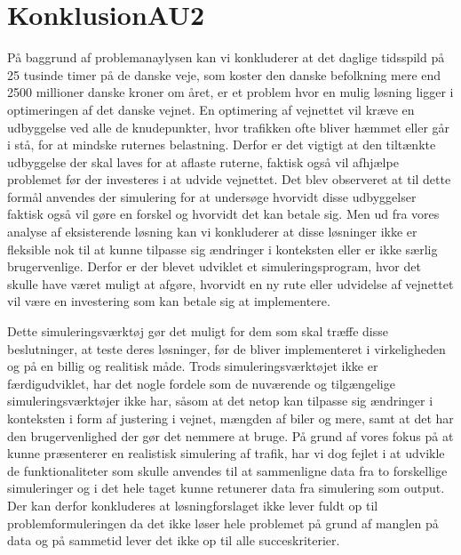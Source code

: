 \chapter{KonklusionAU2}\label{Konklusion}
På baggrund af problemanaylysen kan vi konkluderer at det daglige tidsspild på 25 tusinde timer på de danske veje, som koster den danske befolkning mere end 2500 millioner danske kroner om året, er et problem hvor en mulig løsning ligger i optimeringen af det danske vejnet. En optimering af vejnettet vil kræve en udbyggelse ved alle de knudepunkter, hvor trafikken ofte bliver hæmmet eller går i stå, for at mindske ruternes belastning. Derfor er det vigtigt at den tiltænkte udbyggelse der skal laves for at aflaste ruterne, faktisk også vil afhjælpe problemet før der investeres i at udvide vejnettet. Det blev observeret at til dette formål anvendes der simulering for at undersøge hvorvidt disse udbyggelser faktisk også vil gøre en forskel og hvorvidt det kan betale sig. Men ud fra vores analyse af eksisterende løsning kan vi konkluderer at disse løsninger ikke er fleksible nok til at kunne tilpasse sig ændringer i konteksten eller er ikke særlig brugervenlige. Derfor er der blevet udviklet et simuleringsprogram, hvor det skulle have været muligt at afgøre, hvorvidt en ny rute eller udvidelse af vejnettet vil være en investering som kan betale sig at implementere. 

\vspace{5mm}
 Dette simuleringsværktøj gør det muligt for dem som skal træffe disse beslutninger, at teste deres løsninger, før de bliver implementeret i virkeligheden og på en billig og realitisk måde. Trods simuleringsværktøjet ikke er færdigudviklet, har det nogle fordele som de nuværende og tilgængelige  simuleringsværktøjer ikke har, såsom at det netop kan tilpasse sig ændringer i konteksten i form af justering i vejnet, mængden af biler og mere, samt at det har den brugervenlighed der gør det nemmere at bruge. På grund af vores fokus på at kunne præsenterer en realistisk simulering af trafik, har vi dog fejlet i at udvikle de funktionaliteter som skulle anvendes til at sammenligne data fra to forskellige simuleringer og i det hele taget kunne retunerer data fra simulering som output. Der kan derfor konkluderes at løsningforslaget ikke lever fuldt op til problemformuleringen da det ikke løser hele problemet på grund af manglen på data og på sammetid lever det ikke op til alle succeskriterier. 